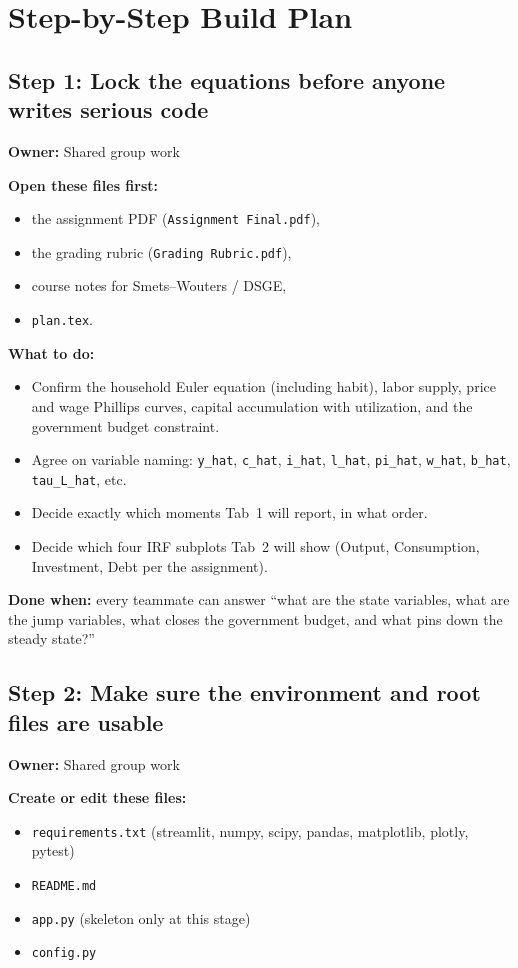 \documentclass[11pt]{article}
\begin{document}
\section{Step-by-Step Build Plan}

\subsection{Step 1: Lock the equations before anyone writes serious code}
\textbf{Owner:} Shared group work

\textbf{Open these files first:}
\begin{itemize}
    \item the assignment PDF (\texttt{Assignment Final.pdf}),
    \item the grading rubric (\texttt{Grading Rubric.pdf}),
    \item course notes for Smets--Wouters / DSGE,
    \item \texttt{plan.tex}.
\end{itemize}

\textbf{What to do:}
\begin{itemize}
    \item Confirm the household Euler equation (including habit), labor supply, price and wage Phillips curves, capital accumulation with utilization, and the government budget constraint.
    \item Agree on variable naming: \texttt{y\_hat}, \texttt{c\_hat}, \texttt{i\_hat}, \texttt{l\_hat}, \texttt{pi\_hat}, \texttt{w\_hat}, \texttt{b\_hat}, \texttt{tau\_L\_hat}, etc.
    \item Decide exactly which moments Tab~1 will report, in what order.
    \item Decide which four IRF subplots Tab~2 will show (Output, Consumption, Investment, Debt per the assignment).
\end{itemize}

\textbf{Done when:} every teammate can answer ``what are the state variables, what are the jump variables, what closes the government budget, and what pins down the steady state?''

\subsection{Step 2: Make sure the environment and root files are usable}
\textbf{Owner:} Shared group work

\textbf{Create or edit these files:}
\begin{itemize}
    \item \texttt{requirements.txt} (streamlit, numpy, scipy, pandas, matplotlib, plotly, pytest)
    \item \texttt{README.md}
    \item \texttt{app.py} (skeleton only at this stage)
    \item \texttt{config.py}
\end{itemize}
\end{document}
